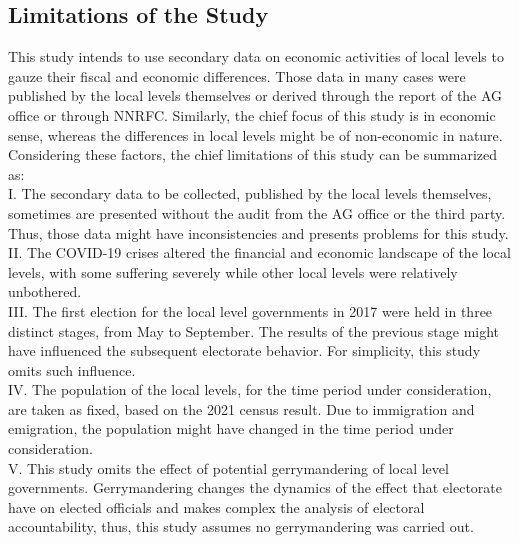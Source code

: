 \subsection{Limitations of the Study}
This study intends to use secondary data on economic activities of local levels to gauze their fiscal and economic differences. Those data in many cases were published by the local levels themselves or derived through the report of the AG office or through NNRFC. Similarly, the chief focus of this study is in economic sense, whereas the differences in local levels might be of non-economic in nature. Considering these factors, the chief limitations of this study can be summarized as:\\
I. \hspace{3mm} The secondary data to be collected, published by the local levels themselves, sometimes are presented without the audit from the AG office or the third party. Thus, those data might have inconsistencies and presents problems for this study.\\
II.\hspace{3mm} The COVID-19 crises altered the financial and economic landscape of the local levels, with some suffering severely while other local levels were relatively unbothered.\\ 
III.\hspace{3mm} The first election for the local level governments in 2017 were held in three distinct stages, from May to September. The results of the previous stage might have influenced the subsequent electorate behavior. For simplicity, this study omits such influence.\\
IV.\hspace{3mm} The population of the local levels, for the time period under consideration, are taken as fixed, based on the 2021 census result. Due to immigration and emigration, the population might have changed in the time period under consideration.\\
V.\hspace{3mm} This study omits the effect of potential gerrymandering of local level governments. Gerrymandering changes the dynamics of the effect that electorate have on elected officials and makes complex the analysis of electoral accountability, thus, this study assumes no gerrymandering was carried out. \vspace{-3mm}
